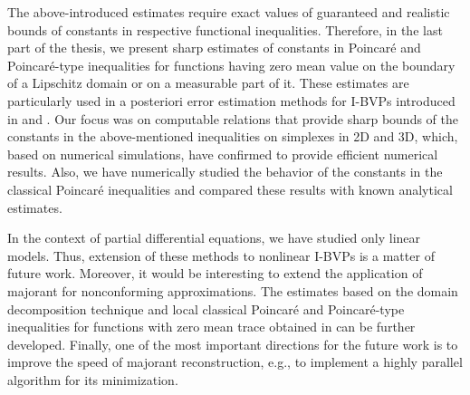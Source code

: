 The above-introduced estimates require exact values of guaranteed and realistic bounds 
of constants in respective functional inequalities. Therefore, in the last part of the 
thesis, we present sharp estimates of constants in Poincar\'{e} and 
Poincar\'{e}-type inequalities for functions having zero mean value on the boundary of 
a Lipschitz domain or on a measurable part of it. These estimates are particularly used 
in a posteriori error estimation methods for I-BVPs introduced in 
\cite{RefMatculevichNeitaanmakiRepin2015} and \cite{RefMatculevichRepinPoincare2014}. 
Our focus was on computable relations that provide sharp bounds of the constants in the 
above-mentioned inequalities on simplexes in 2D and 3D, which, based on numerical 
simulations, have confirmed to provide efficient numerical results. Also, we have 
numerically studied the behavior of the constants in the classical  Poincar\'{e} 
inequalities and compared these results with known analytical estimates.

In the context of partial differential equations, we have studied only linear models. 
Thus, extension of these methods to nonlinear I-BVPs is a matter of future work. 
Moreover, it would be interesting to extend the application of majorant for 
nonconforming approximations. The estimates based on the domain decomposition technique 
and local classical Poincar\'{e} and Poincar\'{e}-type inequalities for functions with 
zero mean trace obtained in \cite{RefMatculevichRepinPoincare2014} can be further 
developed. Finally, one of the most important directions for the future work is to 
improve the speed of majorant reconstruction, e.g., to implement a highly parallel 
algorithm for its minimization. 

